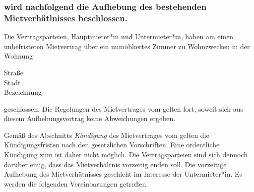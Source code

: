 

\subsubsection*{wird nachfolgend die Aufhebung des bestehenden
  Mietverhätlnisses beschlossen.}

Die Vertragsparteien, Hauptmieter*in und Untermieter*in, haben am
\textbf{\CONTRACTdate} einen unbefristeten Mietvertrag über ein
unmöbliertes Zimmer zu Wohnzwecken in der Wohnung

\vspace{2ex}
\begin{addmargin}[.25\textwidth]{.25\textwidth}
  Straße \MYdotfill \textbf{\WOHNUNGstreet~\WOHNUNGstreetnumber} \\
  Stadt \MYdotfill \textbf{\WOHNUNGzipcode~\WOHNUNGcity} \\
  Bezeichnung \MYdotfill \textbf{\WOHNUNGinfoA~\WOHNUNGinfoB}
\end{addmargin}
\vspace{2ex}

geschlossen. Die Regelungen des Mietvertrages vom \CONTRACTdate{} gelten
fort, soweit sich aus diesem Aufhebungsvertrag keine Abweichungen ergeben.

Gemäß des Abschnitts \emph{Kündigung} des Mietvertrages vom \CONTRACTdate{}
gelten die Kündigungsfristen nach den gesetzlichen Vorschriften. Eine
ordentliche Kündigung zum \CONTRACTenddate{} ist daher nicht möglich. Die
Vertragsparteien sind sich dennoch darüber einig, dass das Mietverhältnis
vorzeitig enden soll. Die vorzeitige Aufhebung des Mietverhätnisses
geschieht im Interesse der Untermieter*in. Es werden die folgenden
Vereinbarungen getroffen.



